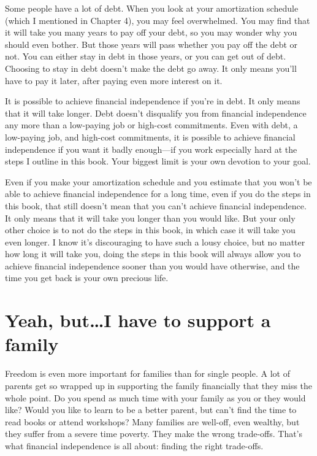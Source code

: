 Some people have a lot of debt. When you look at your amortization schedule (which I mentioned in Chapter 4), you may feel overwhelmed. You may find that it will take you many years to pay off your debt, so you may wonder why you should even bother. But those years will pass whether you pay off the debt or not. You can either stay in debt in those years, or you can get out of debt. Choosing to stay in debt doesn't make the debt go away. It only means you'll have to pay it later, after paying even more interest on it.

It is possible to achieve financial independence if you're in debt. It only means that it will take longer. Debt doesn't disqualify you from financial independence any more than a low-paying job or high-cost commitments. Even with debt, a low-paying job, and high-cost commitments, it is possible to achieve financial independence if you want it badly enough---if you work especially hard at the steps I outline in this book. Your biggest limit is your own devotion to your goal.

Even if you make your amortization schedule and you estimate that you won't be able to achieve financial independence for a long time, even if you do the steps in this book, that still doesn't mean that you can't achieve financial independence. It only means that it will take you longer than you would like. But your only other choice is to not do the steps in this book, in which case it will take you even longer. I know it's discouraging to have such a lousy choice, but no matter how long it will take you, doing the steps in this book will always allow you to achieve financial independence sooner than you would have otherwise, and the time you get back is your own precious life.

\section{Yeah, but\ldots I have to support a family}
Freedom is even more important for families than for single people. A lot of parents get so wrapped up in supporting the family financially that they miss the whole point. Do you spend as much time with your family as you or they would like? Would you like to learn to be a better parent, but can't find the time to read books or attend workshops? Many families are well-off, even wealthy, but they suffer from a severe time poverty. They make the wrong trade-offs. That's what financial independence is all about: finding the right trade-offs.

